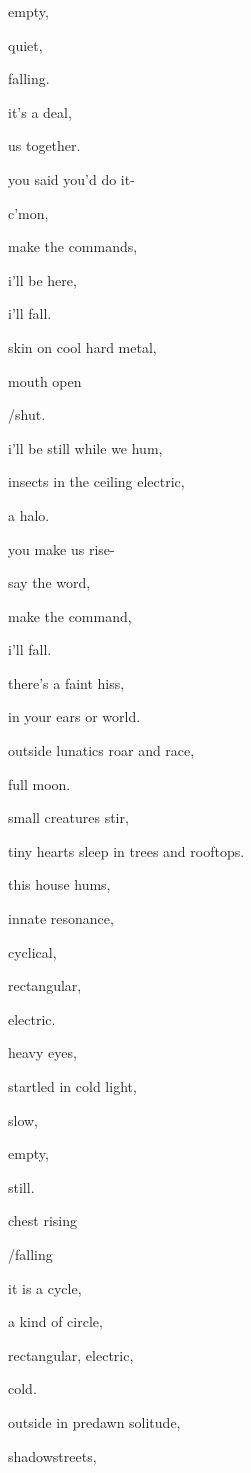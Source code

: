 \documentclass{article}
\begin{document}
	empty,

	quiet,

	falling.\newpage

	it's a deal,

	us together.

	you said you'd do it-\newpage

	c'mon,

	make the commands,

	i'll be here,

	i'll fall.\newpage

	skin on cool hard metal,

	mouth open

	/shut.

	\newpage
	i'll be still while we hum,

	insects in the ceiling electric,

	a halo.\newpage

	you make us rise-

	say the word,

	make the command,

	i'll fall.
	\newpage

	there's a faint hiss,

	in your ears or world.\newpage

	outside lunatics roar and race,

	full moon.

	small creatures stir,

	tiny hearts sleep in trees and rooftops.\newpage

	this house hums,

	innate resonance,

	cyclical,

	rectangular,

	electric.\newpage

	heavy eyes,

	startled in cold light,

	slow,

	empty,

	still.\newpage

	chest rising

	/falling\newpage

	it is a cycle,

	a kind of circle,

	rectangular, electric,

	cold.\newpage

	outside in predawn solitude,

	shadowstreets,
\end{document}
